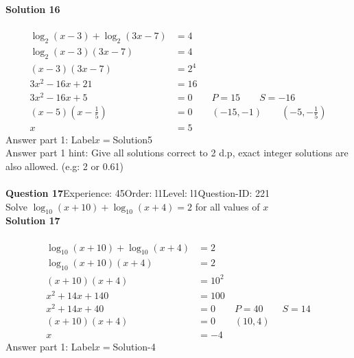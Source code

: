 \documentclass{article}
\begin{document}
\noindent\textbf{Solution 16}\\[2pt]
\\[-35pt]\begin{align*}
\log_{2}(x-3)+\log_{2}(3x-7)&=4\\[2pt]
\log_{2}(x-3)(3x-7)&=4\\[2pt]
(x-3)(3x-7)&=2^4\\[2pt]
3x^2-16x+21&=16\\[2pt]
3x^2-16x+5&=0\qquad P=15 \qquad S=-16\\[2pt]
(x-5)\left(x-\displaystyle\frac{1}{5}\right)&=0\qquad (-15,-1) \qquad \left(-5,-\displaystyle\frac{1}{5}\right)\\[2pt]
x&=5
\end{align*}
Answer part 1: \hspace{10pt}Label\hspace{10pt}$x=$\hspace{10pt}Solution\hspace{10pt}5\\
Answer part 1 hint: \hspace{15pt}Give all solutions correct to 2 d.p, exact integer solutions are also allowed. (e.g: 2 or 0.61)\\
\\[4pt]
\noindent\textbf{Question 17}\hspace{20pt}Experience: 45\hspace{20pt}Order: l1\hspace{20pt}Level: l1\hspace{20pt}Question-ID: 221\\[2pt]
Solve $\log_{10}(x+10)+\log_{10}(x+4)=2$ for all values of $x$\\[4pt]
\noindent\textbf{Solution 17}\\[2pt]
\\[-35pt]\begin{align*}
\log_{10}(x+10)+\log_{10}(x+4)&=2\\[2pt]
\log_{10}(x+10)(x+4)&=2\\[2pt]
(x+10)(x+4)&=10^2\\[2pt]
x^2+14x+140&=100\\[2pt]
x^2+14x+40&=0\qquad P=40 \qquad S=14\\[2pt]
(x+10)(x+4)&=0\qquad (10,4)\\[2pt]
x&=-4
\end{align*}
Answer part 1: \hspace{10pt}Label\hspace{10pt}$x=$\hspace{10pt}Solution\hspace{10pt}-4\\
\end{document}
